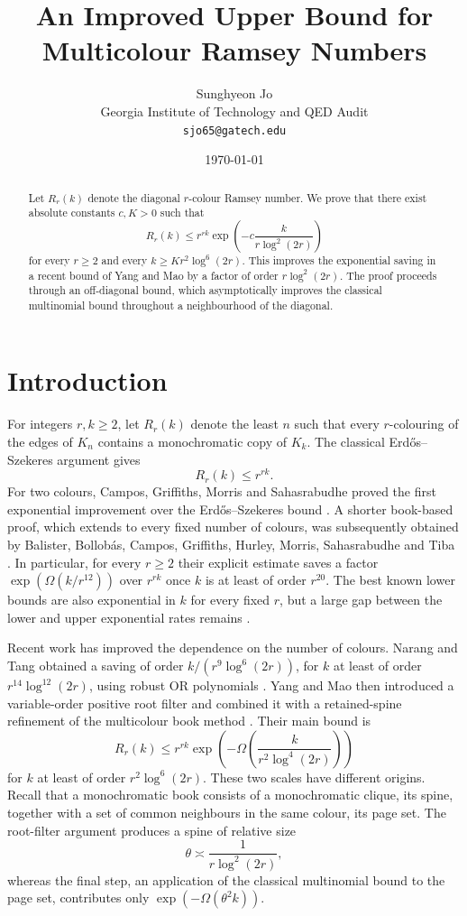 \documentclass[11pt]{article}
\title{An Improved Upper Bound for Multicolour Ramsey Numbers}
\author{%
 Sunghyeon Jo\\
 {\small Georgia Institute of Technology and QED Audit}\\
 {\small\texttt{sjo65@gatech.edu}}
}
\date{\today}
\theoremstyle{definition}
\begin{document}
\maketitle

\begin{abstract}
Let $R_r(k)$ denote the diagonal $r$-colour Ramsey number.  We prove that
there exist absolute constants $c,K>0$ such that
\[
 R_r(k)\le r^{rk}\exp\!\left(-c\frac{k}{r\log^2(2r)}\right)
\]
for every $r\ge2$ and every $k\ge Kr^2\log^6(2r)$.  This improves the
exponential saving in a recent bound of Yang and Mao by a factor of order
$r\log^2(2r)$.  The proof proceeds through an off-diagonal bound, which
asymptotically improves the classical multinomial bound throughout a
neighbourhood of the diagonal.
\end{abstract}

\section{Introduction}
For integers $r,k\ge2$, let $R_r(k)$ denote the least $n$ such that every
$r$-colouring of the edges of $K_n$ contains a monochromatic copy of $K_k$.
The classical Erd\H{o}s--Szekeres argument \cite{ES} gives
\[
 R_r(k)\le r^{rk}.
\]
For two colours, Campos, Griffiths, Morris and Sahasrabudhe proved the first
exponential improvement over the Erd\H{o}s--Szekeres bound
\cite{CGMS}.  A shorter book-based proof, which extends to every fixed number
of colours, was subsequently obtained by Balister, Bollob\'as, Campos,
Griffiths, Hurley, Morris, Sahasrabudhe and Tiba \cite{BBCGHMST}.  In
particular, for every $r\ge2$ their explicit estimate saves a factor
$\exp(\Omega(k/r^{12}))$ over $r^{rk}$ once $k$ is at least of order
$r^{20}$.  The best known lower bounds are also exponential in $k$ for every
fixed $r$, but a large gap between the lower and upper exponential rates
remains \cite{CamposPohoata}.

Recent work has improved the dependence on the number of colours.
Narang and Tang obtained a saving of order $k/(r^9\log^6(2r))$, for $k$ at
least of order $r^{14}\log^{12}(2r)$, using robust OR polynomials
\cite{NarangTang}.  Yang and Mao
then introduced a variable-order positive root filter and combined it with a
retained-spine refinement of the multicolour book method \cite{YangMao}.  Their
main bound is
\begin{equation}\label{eq:YM-main}
 R_r(k)\le r^{rk}\exp\!\left(-\Omega\!\left(\frac{k}{r^2\log^4(2r)}\right)\right)
\end{equation}
for $k$ at least of order $r^2\log^6(2r)$.
These two scales have different origins.  Recall that a monochromatic book
consists of a monochromatic clique, its spine, together with a set of common
neighbours in the same colour, its page set.  The root-filter argument produces
a spine of relative size
\[
 \theta\asymp \frac1{r\log^2(2r)},
\]
whereas the final step, an application of the classical multinomial bound to
the page set, contributes only $\exp(-\Omega(\theta^2k))$.
\end{document}
